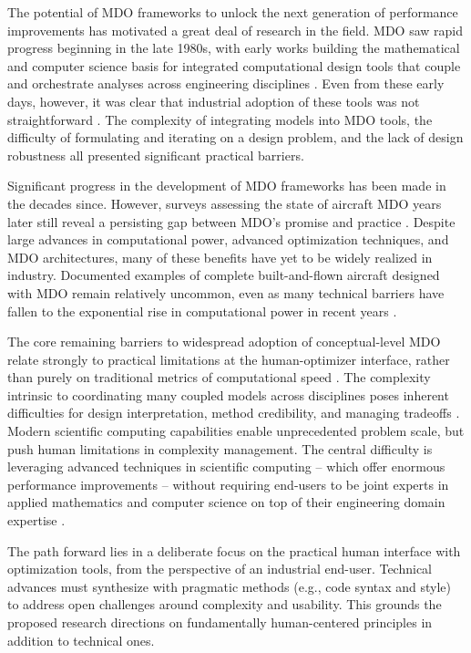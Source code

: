 The potential of MDO frameworks to unlock the next generation of performance improvements has motivated a great deal of research in the field. MDO saw rapid progress beginning in the late 1980s, with early works building the mathematical and computer science basis for integrated computational design tools that couple and orchestrate analyses across engineering disciplines \cite{ashley_making_1982, vanderplaats_automated_1976, haftka_multidisciplinary_1997}. Even from these early days, however, it was clear that industrial adoption of these tools was not straightforward \cite{kroo_multidisciplinary_1997, drela_pros_1998}. The complexity of integrating models into MDO tools, the difficulty of formulating and iterating on a design problem, and the lack of design robustness all presented significant practical barriers.

Significant progress in the development of MDO frameworks has been made in the decades since. However, surveys assessing the state of aircraft MDO years later still reveal a persisting gap between MDO’s promise and practice \cite{agte_mdo_2010, drela_design_2011}. Despite large advances in computational power, advanced optimization techniques, and MDO architectures, many of these benefits have yet to be widely realized in industry. Documented examples of complete built-and-flown aircraft designed with MDO remain relatively uncommon, even as many technical barriers have fallen to the exponential rise in computational power in recent years \cite{gazaix_industrialization_2017}.

The core remaining barriers to widespread adoption of conceptual-level MDO relate strongly to practical limitations at the human-optimizer interface, rather than purely on traditional metrics of computational speed \cite{gpkit}. The complexity intrinsic to coordinating many coupled models across disciplines poses inherent difficulties for design interpretation, method credibility, and managing tradeoffs \cite{salas_framework_1998}. Modern scientific computing capabilities enable unprecedented problem scale, but push human limitations in complexity management. The central difficulty is leveraging advanced techniques in scientific computing -- which offer enormous performance improvements -- without requiring end-users to be joint experts in applied mathematics and computer science on top of their engineering domain expertise \cite{ma_modelingtoolkit_2021}.

The path forward lies in a deliberate focus on the practical human interface with optimization tools, from the perspective of an industrial end-user. Technical advances must synthesize with pragmatic methods (e.g., code syntax and style) to address open challenges around complexity and usability. This grounds the proposed research directions on fundamentally human-centered principles in addition to technical ones.

